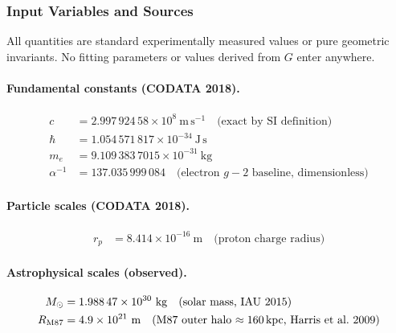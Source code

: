 \documentclass[11pt,a4paper]{article}
\begin{document}
      \subsubsection{Input Variables and Sources}

        All quantities are standard experimentally measured values or
        pure geometric invariants.  No fitting parameters or values
        derived from $G$ enter anywhere.

        \paragraph{Fundamental constants (CODATA 2018).}
        \begin{align*}
          c      &= 2.997\,924\,58 \times 10^{8}\ \mathrm{m\,s^{-1}}
                     \quad\text{(exact by SI definition)} \\
          \hbar  &= 1.054\,571\,817 \times 10^{-34}\ \mathrm{J\,s} \\
          m_e    &= 9.109\,383\,7015 \times 10^{-31}\ \mathrm{kg} \\
          \alpha^{-1} &= 137.035\,999\,084
                     \quad\text{(electron $g{-}2$ baseline, dimensionless)}
        \end{align*}

        \paragraph{Particle scales (CODATA 2018).}
        \begin{align*}
          r_p    &= 8.414 \times 10^{-16}\ \mathrm{m}
                     \quad\text{(proton charge radius)}
        \end{align*}

        \paragraph{Astrophysical scales (observed).}
        \begin{align*}
          M_\odot      &= 1.988\,47 \times 10^{30}\ \mathrm{kg}
                          \quad\text{(solar mass, IAU 2015)} \\
          R_{\rm M87}  &= 4.9 \times 10^{21}\ \mathrm{m}
                          \quad\text{(M87 outer halo $\approx 160$\,kpc,
                          Harris et al.\ 2009)}
        \end{align*}
\end{document}
